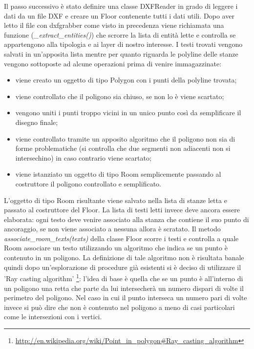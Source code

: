 \documentclass[12pt]{report}
\begin{document}
Il passo successivo è stato definire una classe DXFReader in grado di leggere i dati da un file DXF e creare un Floor contenente tutti i dati utili.
Dopo aver letto il file con dxfgrabber come visto in precedenza viene richiamata una funzione (\textit{\_extract\_entities()}) che scrorre la lista di entità lette e controlla se appartengono alla tipologia e ai layer di nostro interesse.
I testi trovati vengono salvati in un'apposita lista mentre per quanto riguarda le polyline delle stanze vengono sottoposte ad alcune operazioni prima di venire immagazzinate:
\begin{itemize}
\item viene creato un oggetto di tipo Polygon con i punti della polyline trovata;
\item viene controllato che il poligono sia chiuso, se non lo è viene scartato;
\item vengono uniti i punti troppo vicini in un unico punto così da semplificare il disegno finale;
\item viene controllato tramite un apposito algoritmo che il poligono non sia di forme problematiche (si controlla che due segmenti non adiacenti non si intersechino) in caso contrario viene scartato;
\item viene istanziato un oggetto di tipo Room semplicemente passando al costruttore il poligono controllato e semplificato.
\end{itemize}

L'oggetto di tipo Room risultante viene salvato nella lista di stanze letta e passato al costruttore del Floor. La lista di testi letti invece deve ancora essere elaborata: ogni testo deve venire associato alla stanza che contiene il suo punto di ancoraggio, se non viene associato a nessuna allora è scratato.
Il metodo \textit{associate\_room\_texts(texts)} della classe Floor scorre i testi e controlla a quale Room associare un testo utilizzando un algoritmo che indica se un punto è contenuto in un poligono. 
La definizione di tale algoritmo non è risultata banale quindi dopo un'esplorazione di procedure già esistenti si è deciso di utilizzare il 'Ray casting algorithm' \footnote{\url{http://en.wikipedia.org/wiki/Point\_in\_polygon\#Ray\_casting\_algorithm}}: l'idea di base è quella che se un punto è all'interno di un poligono una retta che parte da lui intersecherà un numero dispari di volte il perimetro del poligono. Nel caso in cui il punto interseca un numero pari di volte invece si può dire che non è contenuto nel poligono a meno di casi particolari come le intersezioni con i vertici.
\end{document}
